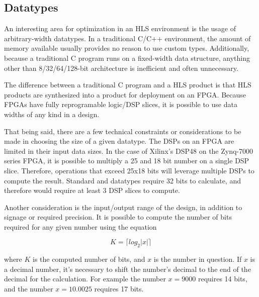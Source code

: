 \documentclass[11pt]{report}
\begin{document}
\begin{quote}
\begin{singlespace}
    
\end{singlespace}
\end{quote}

\subsection{Datatypes}\label{FIRdata}

An interesting area for optimization in an HLS environment is the usage of arbitrary-width datatypes. In a traditional C/C++ environment, the amount of memory available usually provides no reason to use custom types. Additionally, because a traditional C program runs on a fixed-width data structure, anything other than 8/32/64/128-bit architecture is inefficient and often unnecessary.

The difference between a traditional C program and a HLS product is that HLS products are synthesized into a product for deployment on an FPGA. Because FPGAs have fully reprogramable logic/DSP slices, it is possible to use data widths of any kind in a design.

That being said, there are a few technical constraints or considerations to be made in choosing the size of a given datatype. The DSPs on an FPGA are limited in their input data sizes. In the case of Xilinx's DSP48 on the Zynq-7000 series FPGA, it is possible to multiply a 25 and 18 bit number on a single DSP slice. Therefore, operations that exceed 25x18 bits will leverage multiple DSPs to compute the result. Standard  and  datatypes require 32 bits to calculate, and therefore would require at least 3 DSP slices to compute.

Another consideration is the input/output range of the design, in addition to signage or required precision. It is possible to compute the number of bits required for any given number using the equation

\begin{equation}\label{widthEQ}
	K = \lceil log_2{|x|} \rceil
\end{equation}

where $K$ is the computed number of bits, and $x$ is the number in question. If $x$ is a decimal number, it's necessary to shift the number's decimal to the end of the decimal for the calculation. For example the number $x = 9000$ requires 14 bits, and the number $x = 10.0025$ requires 17 bits.
\end{document}
